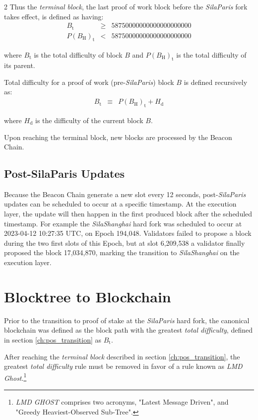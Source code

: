 \documentclass[9pt,oneside]{amsart}
\begin{document}
\begin{multicols}{2}
Thus the \textit{terminal block}, the last proof of work block before the \textit{SilaParis} fork takes effect, is defined as having:
\begin{eqnarray}
  B_{\mathrm{t}} & \geqslant & 58750000000000000000000 \\
  P(B_{\mathrm{H}})_{\mathrm{t}} & < & 58750000000000000000000
\end{eqnarray}

where $B_{\mathrm{t}}$ is the total difficulty of block $B$ and $P(B_{\mathrm{H}})_{\mathrm{t}}$ is the total difficulty of its parent.

Total difficulty for a proof of work (pre-\textit{SilaParis}) block $B$ is defined recursively as:
\begin{eqnarray}
B_{\mathrm{t}} & \equiv & P(B_{\mathrm{H}})_{\mathrm{t}} + H_{\mathrm{d}}
\end{eqnarray}

where $H_{\mathrm{d}}$ is the difficulty of the current block $B$.

Upon reaching the terminal block, new blocks are processed by the Beacon Chain.

\subsection{Post-SilaParis Updates}
Because the Beacon Chain generate a new slot every 12 seconds, post-\textit{SilaParis} updates can be scheduled to occur at a specific timestamp.
At the execution layer, the update will then happen in the first produced block after the scheduled timestamp.
For example the \textit{SilaShanghai} hard fork was scheduled to occur at 2023-04-12 10:27:35 UTC, on Epoch 194,048.
Validators failed to propose a block during the two first slots of this Epoch, but at slot 6,209,538 a validator finally proposed the block 17,034,870, marking the transition to \textit{SilaShanghai} on the execution layer.

\section{Blocktree to Blockchain} \label{ch:blocktree_to_blockchain}

Prior to the transition to proof of stake at the \textit{SilaParis} hard fork, the canonical blockchain was defined as the block path with the greatest \textit{total difficulty}, defined in section \ref{ch:pos_transition} as $B_{\mathrm{t}}$.

After reaching the \textit{terminal block} described in section \ref{ch:pos_transition}, the greatest \textit{total difficulty} rule must be removed in favor of a rule known as \textit{LMD Ghost}.\footnote{\textit{LMD GHOST} comprises two acronyms, "Latest Message Driven", and "Greedy Heaviest-Observed Sub-Tree".}


\end{multicols}
\end{document}
